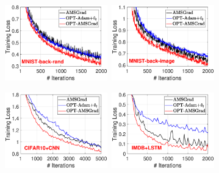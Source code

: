 \documentclass[twoside]{article}
\begin{document}
\begin{figure}[t]
\centering
\mbox{\hspace{-0.15in}
\includegraphics[width=1.75in]{simulation/fig2/M_rand_train_loss_no1.eps}\hspace{-0.1in}
\includegraphics[width=1.75in]{simulation/fig2/M_image_train_loss_no1.eps}\hspace{-0.1in}
}

\mbox{\hspace{-0.15in}
\includegraphics[width=1.75in]{simulation/fig2/cifar_cnn_train_loss_no1.eps}\hspace{-0.1in}
\includegraphics[width=1.75in]{simulation/fig2/imdb_lstm_train_loss_no1.eps}
}


\end{figure}
\end{document}
